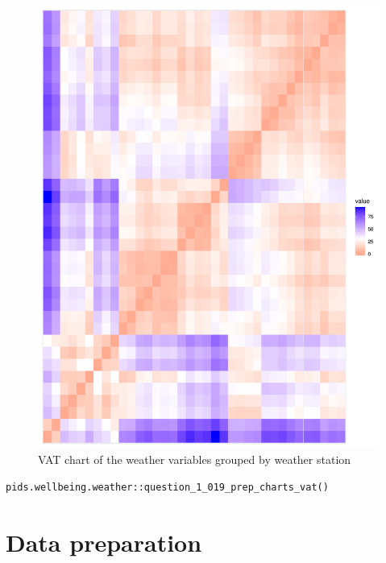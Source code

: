 \documentclass[12pt, oneside, openany]{book}
\begin{document}
\bigskip
\begin{figure}
	\centering
	\captionsetup{justification=centering}
	\includegraphics[scale=0.4]{question_1_019_prep_charts_vat}
	\caption{VAT chart of the weather variables grouped by weather station}
	\label{fig:question_1_019_prep_charts_vat}
\end{figure}

\bigskip
\begin{lstlisting}
pids.wellbeing.weather::question_1_019_prep_charts_vat()
\end{lstlisting}

\section*{Data preparation}
\end{document}
